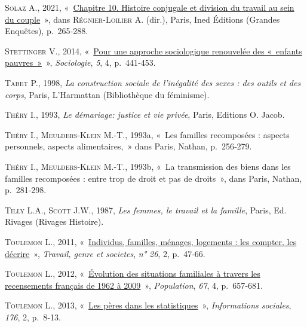 \documentclass[
  12pt,
]{book}
\newlength{\cslhangindent}
\newenvironment{CSLReferences}[2] %
 {\begin{list}{}{%
  \setlength{\itemindent}{0pt}
  \setlength{\leftmargin}{0pt}
  \setlength{\parsep}{0pt}
  \ifodd #1
   \setlength{\leftmargin}{\cslhangindent}
   \setlength{\itemindent}{-1\cslhangindent}
  \fi
  \setlength{\itemsep}{#2\baselineskip}}}
 {\end{list}}
\begin{document}
\begin{CSLReferences}{0}{1}
\textsc{Solaz A.}, 2021,
{«~\href{http://books.openedition.org/ined/5068}{Chapitre 10. Histoire
conjugale et division du travail au sein du couple}~»}, dans
\textsc{Régnier-Loilier A.} (dir.), Paris, Ined Éditions (Grandes
Enquêtes), p.~265‑288.

\textsc{Stettinger V.}, 2014,
{«~\href{https://doi.org/10.3917/socio.054.0441}{Pour une approche
sociologique renouvelée des «~enfants pauvres~»}~»}, \emph{Sociologie},
\emph{5}, 4, p.~441‑453.

\textsc{Tabet P.}, 1998, \emph{La construction sociale de l'inégalité
des sexes : des outils et des corps}, Paris, L'Harmattan (Bibliothèque
du féminisme).

\textsc{Théry I.}, 1993, \emph{Le démariage: justice et vie privée},
Paris, Editions O. Jacob.

\textsc{Théry I.}, \textsc{Meulders-Klein M.-T.}, 1993a, {«~Les familles
recomposées : aspects personnels, aspects alimentaires,~»} dans Paris,
Nathan, p.~256‑279.

\textsc{Théry I.}, \textsc{Meulders-Klein M.-T.}, 1993b, {«~La
transmission des biens dans les familles recomposées : entre trop de
droit et pas de droits~»}, dans Paris, Nathan, p.~281‑298.

\textsc{Tilly L.A.}, \textsc{Scott J.W.}, 1987, \emph{Les femmes, le
travail et la famille}, Paris, Ed. Rivages (Rivages Histoire).

\textsc{Toulemon L.}, 2011,
{«~\href{https://www.cairn.info/revue-travail-genre-et-societes-2011-2-page-47.htm}{Individus,
familles, ménages, logements : les compter, les décrire}~»},
\emph{Travail, genre et societes}, \emph{n° 26}, 2, p.~47‑66.

\textsc{Toulemon L.}, 2012,
{«~\href{https://doi.org/10.3917/popu.1204.0657}{Évolution des
situations familiales à travers les recensements français de 1962 à
2009}~»}, \emph{Population}, \emph{67}, 4, p.~657‑681.

\textsc{Toulemon L.}, 2013,
{«~\href{https://doi.org/10.3917/inso.176.0008}{Les pères dans les
statistiques}~»}, \emph{Informations sociales}, \emph{176}, 2, p.~8‑13.


\end{CSLReferences}
\end{document}
